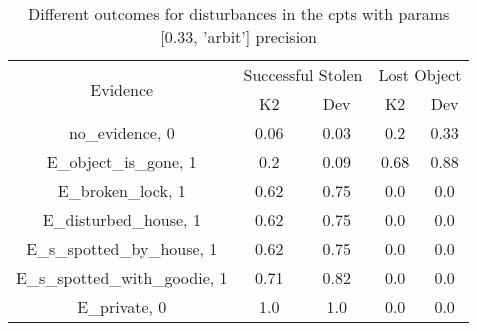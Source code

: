 \begin{table}\begin{tabular}{c|cc|cc}\toprule\multirow{2}{*}{Evidence} & \multicolumn{2}{c}{Successful Stolen} & \multicolumn{2}{c}{Lost Object} \\& {K2} & {Dev} & {K2} & {Dev} \\\midrule
no\_evidence, 0 & \cellcolor{Bittersweet}0.06&\cellcolor{Bittersweet}0.03&\cellcolor{Bittersweet}0.2&\cellcolor{Bittersweet}0.33\\E\_object\_is\_gone, 1 & \cellcolor{Bittersweet}0.2&\cellcolor{Bittersweet}0.09&\cellcolor{Bittersweet}0.68&\cellcolor{Bittersweet}0.88\\E\_broken\_lock, 1 & \cellcolor{Bittersweet}0.62&\cellcolor{Bittersweet}0.75&0.0&0.0\\E\_disturbed\_house, 1 & \cellcolor{Bittersweet}0.62&\cellcolor{Bittersweet}0.75&0.0&0.0\\E\_s\_spotted\_by\_house, 1 & \cellcolor{Bittersweet}0.62&\cellcolor{Bittersweet}0.75&0.0&0.0\\E\_s\_spotted\_with\_goodie, 1 & \cellcolor{Bittersweet}0.71&\cellcolor{Bittersweet}0.82&0.0&0.0\\E\_private, 0 & 1.0&1.0&0.0&0.0\\\bottomrule\end{tabular}\caption{Different outcomes for disturbances in the cpts with params [0.33, 'arbit'] precision}\end{table}